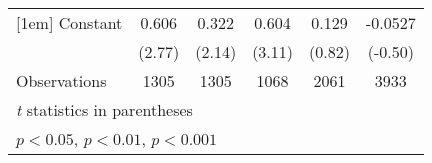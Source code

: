 {\begin{tabular}{l*{5}{c}}
[1em]
Constant        &    0.606\sym{**} &    0.322\sym{*}  &    0.604\sym{**} &    0.129         &  -0.0527         \\
                &   (2.77)         &   (2.14)         &   (3.11)         &   (0.82)         &  (-0.50)         \\
\hline
Observations    &     1305         &     1305         &     1068         &     2061         &     3933         \\
\hline\hline
\multicolumn{6}{l}{\footnotesize \textit{t} statistics in parentheses}\\
\multicolumn{6}{l}{\footnotesize \sym{*} \(p<0.05\), \sym{**} \(p<0.01\), \sym{***} \(p<0.001\)}\\
\end{tabular}
}
